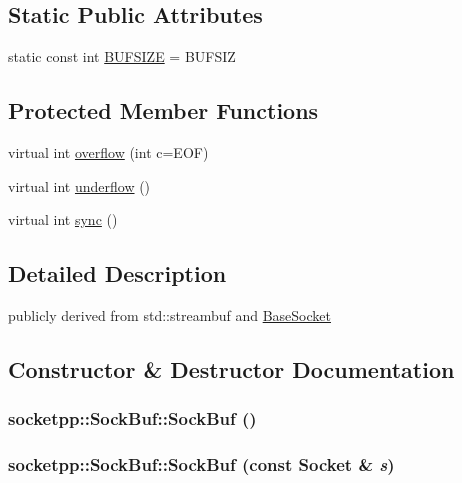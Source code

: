 \subsection*{Static Public Attributes}
\begin{CompactItemize}
\item 
static const int \hyperlink{classsocketpp_1_1SockBuf_2b90c5705f30dd3fda03a6eb13378e15}{BUFSIZE} = BUFSIZ
\end{CompactItemize}
\subsection*{Protected Member Functions}
\begin{CompactItemize}
\item 
virtual int \hyperlink{classsocketpp_1_1SockBuf_5a1f6d2304fe83a8602e07d12032b2c7}{overflow} (int c=EOF)
\item 
virtual int \hyperlink{classsocketpp_1_1SockBuf_34ccc364e9f20a25199bea9fdde19bdd}{underflow} ()
\item 
virtual int \hyperlink{classsocketpp_1_1SockBuf_33c3d2907102b5b38daca32fb2c12591}{sync} ()
\end{CompactItemize}


\subsection{Detailed Description}
publicly derived from std::streambuf and \hyperlink{classsocketpp_1_1BaseSocket}{BaseSocket} 

\subsection{Constructor \& Destructor Documentation}
\hypertarget{classsocketpp_1_1SockBuf_e02aca0e93d6b6227ba492cdc2690d9a}{
\subsubsection[{SockBuf}]{\setlength{\rightskip}{0pt plus 5cm}socketpp::SockBuf::SockBuf ()}}
\label{classsocketpp_1_1SockBuf_e02aca0e93d6b6227ba492cdc2690d9a}


\hypertarget{classsocketpp_1_1SockBuf_065ef76cdf18c04857350c643bd620e3}{
\subsubsection[{SockBuf}]{\setlength{\rightskip}{0pt plus 5cm}socketpp::SockBuf::SockBuf (const {\bf Socket} \& {\em s})}}
\label{classsocketpp_1_1SockBuf_065ef76cdf18c04857350c643bd620e3}


